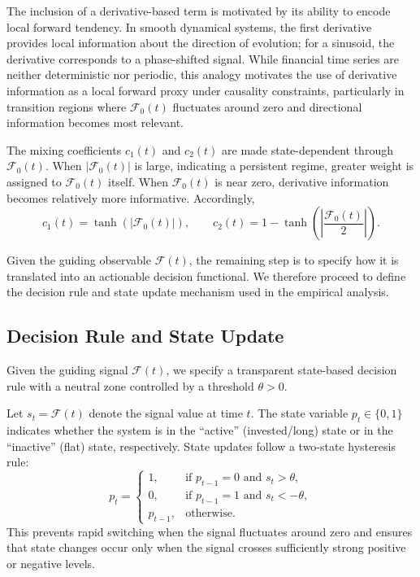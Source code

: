 \documentclass[final,5p,times,twocolumn]{elsarticle}
\begin{document}
The inclusion of a derivative-based term is motivated by its ability to encode local forward tendency.
In smooth dynamical systems, the first derivative provides local information about the direction of evolution; for a sinusoid, the derivative corresponds to a phase-shifted signal.
While financial time series are neither deterministic nor periodic,
this analogy motivates the use of derivative information as a local
forward proxy under causality constraints, particularly in transition
regions where $\mathscr{F}_0(t)$ fluctuates around zero and directional
information becomes most relevant.

The mixing coefficients $c_1(t)$ and $c_2(t)$ are made state-dependent through $\mathscr{F}_0(t)$.
When $|\mathscr{F}_0(t)|$ is large, indicating a persistent regime, greater weight is assigned to $\mathscr{F}_0(t)$ itself.
When $\mathscr{F}_0(t)$ is near zero, derivative information becomes relatively more informative.
Accordingly,
\begin{equation}
c_1(t) = \tanh\!\left( \lvert \mathscr{F}_0(t) \rvert \right),
\qquad
c_2(t) = 1 - \tanh\!\left( \left\lvert \frac{\mathscr{F}_0(t)}{2} \right\rvert \right).
\end{equation}

Given the guiding observable $\mathscr{F}(t)$, the remaining step is to specify how it is translated into an actionable decision functional. We therefore proceed to define the decision rule and state update mechanism used in the empirical analysis.

\subsection{Decision Rule and State Update}
\label{subsec:trading_rule}

Given the guiding signal $\mathscr{F}(t)$, we specify a transparent state-based decision rule with a neutral zone controlled by a threshold $\theta > 0$.

Let $s_t = \mathscr{F}(t)$ denote the signal value at time $t$.
The state variable $p_t \in \{0,1\}$ indicates whether the system is in the ``active'' (invested/long) state or in the ``inactive'' (flat) state, respectively.
State updates follow a two-state hysteresis rule:
\begin{equation}
p_t =
\begin{cases}
1, & \text{if } p_{t-1}=0 \text{ and } s_t > \theta,\\
0, & \text{if } p_{t-1}=1 \text{ and } s_t < -\theta,\\
p_{t-1}, & \text{otherwise}.
\end{cases}
\label{eq:state_machine}
\end{equation}
This prevents rapid switching when the signal fluctuates around zero and ensures that state changes occur only when the signal crosses sufficiently strong positive or negative levels.
\end{document}
